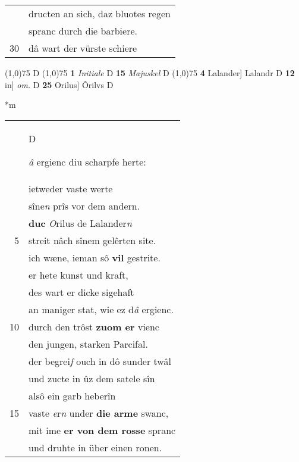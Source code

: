 \documentclass[8pt,a4paper,notitlepage]{article}
\begin{document}
\begin{table}[ht]
\begin{minipage}[t]{0.5\linewidth}
\begin{tabular}{rl}
 & dructen an sich, daz bluotes regen\\ 
 & spranc durch die barbiere.\\ 
30 & dâ wart der vürste schiere\\ 
\end{tabular}
\scriptsize
\line(1,0){75} \newline
D \newline
\line(1,0){75} \newline
\textbf{1} \textit{Initiale} D  \textbf{15} \textit{Majuskel} D  \newline
\line(1,0){75} \newline
\textbf{4} Lalander] Lalandr D \textbf{12} in] \textit{om.} D \textbf{25} Orilus] Ôrilvs D \newline
\end{minipage}
\hspace{0.5cm}
\begin{minipage}[t]{0.5\linewidth}
\small
\begin{center}*m
\end{center}
\begin{tabular}{rl}
 & \begin{large}D\end{large}\textit{â} ergienc diu scharpfe herte:\\ 
 & ietweder vaste werte\\ 
 & sîne\textit{n} prîs vor dem andern.\\ 
 & \textbf{duc} \textit{O}rilus de Lalander\textit{n}\\ 
5 & streit nâch sînem gelêrten site.\\ 
 & ich wæne, ieman sô \textbf{vil} gestrite.\\ 
 & er hete kunst und kraft,\\ 
 & des wart er dicke sigehaft\\ 
 & an maniger stat, wie ez d\textit{â} ergienc.\\ 
10 & durch den trôst \textbf{zuom er} vienc\\ 
 & den jungen, starken Parcifal.\\ 
 & der begrei\textit{f} ouch in dô sunder twâl\\ 
 & und zucte in ûz dem satele sîn\\ 
 & alsô ein garb heberîn\\ 
15 & vaste \textit{e}r\textit{n} under \textbf{die arme} swanc,\\ 
 & mit ime \textbf{er von dem rosse} spranc\\ 
 & und druhte in über einen ronen.\\ 

\end{tabular}
\end{minipage}
\end{table}
\end{document}
